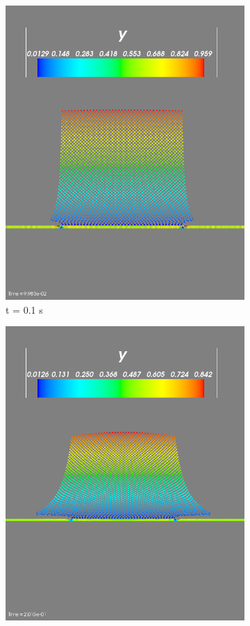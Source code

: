 \documentclass{article}
\begin{document}
\begin{figure}[!htbp]
\begin{subfigure}{.5\textwidth}
  \includegraphics[width=0.8\linewidth]{wc_t1.png}
  \caption{t = 0.1 s}
  \label{fig:su2}
\end{subfigure}
\begin{subfigure}{.5\textwidth}
  \centering
  \includegraphics[width=0.8\linewidth]{wc_t2.png}

\end{subfigure}
\end{figure}
\end{document}
